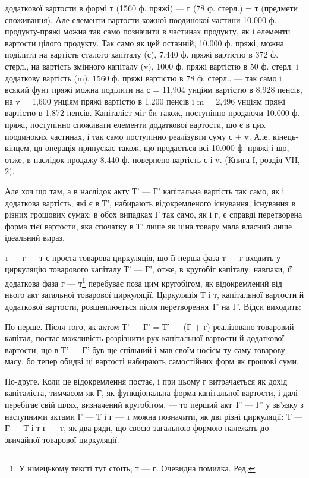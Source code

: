 \parcont{}  %
додаткової вартости в формі т (1560 ф. пряжі) — г (78 ф. стерл.) = т
(предмети споживання). Але елементи вартости кожної поодинокої частини
10.000  ф. продукту-пряжі можна так само позначити в частинах продукту,
як і елементи вартости цілого продукту. Так само як цей останній, 10.000 ф. пряжі, можна поділити на
вартість сталого капіталу (с), 7.440 ф.
пряжі вартістю в 372 ф. стерл., на вартість змінного капіталу (v), 1000 ф.
пряжі вартістю в 50 ф. стерл. і додаткову вартість (m), 1560 ф. пряжі
вартістю в 78 ф. стерл., — так само і всякий фунт пряжі можна поділити
на с = 11,904 унціям вартістю в 8,928 пенсів, на v = 1,600 унціям пряжі
вартістю в 1.200 пенсів і m = 2,496 унціям пряжі вартістю в 1,872 пенсів.
Капіталіст міг би також, поступінно продаючи 10.000 ф. пряжі, поступінно
споживати елементи додаткової вартости, що є в цих поодиноких частинах,
і так само поступінно реалізувти суму с + v. Але, кінець-кінцем, ця операція
припускає також, що продається всі 10.000 ф. пряжі і що, отже, в наслідок
продажу 8.440 ф. повернено вартість с і v. (Книга І, розділ VII, 2).

Але хоч що там, а в наслідок акту Т' — Г' капітальна вартість так
само, як і додаткова вартість, які є в Т', набирають відокремленого
існування, існування в різних грошових сумах; в обох випадках Г так
само, як і г, є справді перетворена форма тієї вартости, яка спочатку
в Т' лише як ціна товару мала власний лише ідеальний вираз.

т — г — т є проста товарова циркуляція, що її перша фаза т — г входить
у циркуляцію товарового капіталу Т' — Г', отже, в кругобіг капіталу;
навпаки, її додаткова фаза г — т\footnote*{
У німецькому тексті тут стоїть; т — г. Очевидна помилка. Ред.
} перебуває поза цим кругобігом, як
відокремлений від нього акт загальної товарової циркуляції. Циркуляція
Т і т, капітальної вартости й додаткової вартости, розщеплюється після
перетворення Т' на Г'. Відси виходить:

По-перше. Після того, як актом Т' — Г' = Т' — (Г + г) реалізовано
товаровий капітал, постає можливість розрізнити рух капітальної
вартости й додаткової вартости, що в Т' — Г' був ще спільний і мав своїм
носієм ту саму товарову масу, бо тепер обидві ці вартості набирають
самостійних форм як грошові суми.

По-друге. Коли це відокремлення постає, і при цьому г витрачається
як дохід капіталіста, тимчасом як Г, як функціональна форма капітальної
вартости, і далі перебігає свій шлях, визначений кругобігом, — то перший
акт Т' — Г' у зв’язку з наступними актами Г — Т і г — т можна позначити,
як дві різні циркуляції: Т — Г — Т і т-г — т, як два ряди, що своєю
загальною формою належать до звичайної товарової циркуляції.

